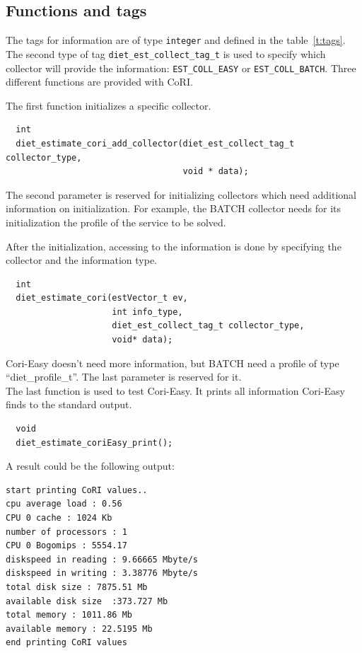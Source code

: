 \subsection{Functions and tags}
The tags for information are of type \texttt{integer} and defined in the
table~\ref{t:tags}. The second type of tag \texttt{diet\_est\_collect\_tag\_t}
is used to specify which collector will provide the information:
\texttt{EST\_COLL\_EASY} or \texttt{EST\_COLL\_BATCH}.
Three different functions are provided with CoRI.

The first function initializes a specific collector.

\footnotesize
\begin{verbatim}
  int
  diet_estimate_cori_add_collector(diet_est_collect_tag_t collector_type,
                                   void * data);
\end{verbatim}
\normalsize The second parameter is reserved for initializing collectors which
need additional information on initialization. For example, the BATCH collector
needs for its initialization the profile of the service to be solved.

After the initialization, accessing to the information is done by specifying
the collector and the information type.
\footnotesize
\begin{verbatim}
  int
  diet_estimate_cori(estVector_t ev,
                     int info_type,
                     diet_est_collect_tag_t collector_type,
                     void* data);
\end{verbatim}
\normalsize

Cori-Easy doesn't need more information, but BATCH need a profile of
type ``diet\_profile\_t''. The last parameter is reserved for it. \\ The last
function is used to test Cori-Easy. It prints all information Cori-Easy finds
to the standard output.

\footnotesize
\begin{verbatim}
  void
  diet_estimate_coriEasy_print();
\end{verbatim}
\normalsize
A result could be the following output:
\footnotesize
\begin{verbatim}
start printing CoRI values..
cpu average load : 0.56
CPU 0 cache : 1024 Kb
number of processors : 1
CPU 0 Bogomips : 5554.17
diskspeed in reading : 9.66665 Mbyte/s
diskspeed in writing : 3.38776 Mbyte/s
total disk size : 7875.51 Mb
available disk size  :373.727 Mb
total memory : 1011.86 Mb
available memory : 22.5195 Mb
end printing CoRI values
\end{verbatim}
\normalsize

